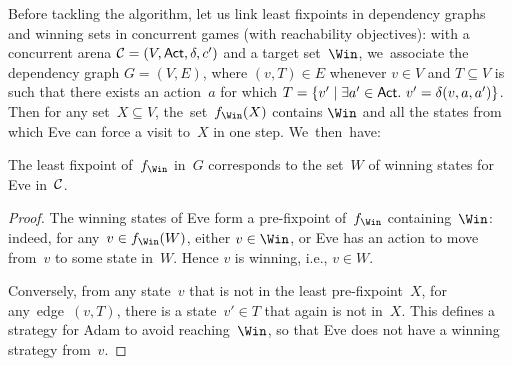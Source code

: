 Before tackling the algorithm, let us link least fixpoints in
dependency graphs and winning sets in concurrent games (with
reachability objectives): with a concurrent arena
$\mathcal{C}=(V,\textsf{Act},\delta,c')$ and a target set~$\Win$, we~associate
the dependency graph $G=(V,E)$, where $(v,T)\in E$ whenever $v\in V$
and $T\subseteq V$ is such that there exists an action~$a$ for which
$T=\{v' \mid \exists a'\in\Act.\ v'=\delta(v,a,a')\}$.  Then for any
set~$X\subseteq V$, the~set~$f_{\Win}(X)$ contains $\Win$ and all the
states from which Eve can force a visit to~$X$ in one step.
We~then~have:
\begin{proposition}\label{9-prop:fixp-game}
The least fixpoint of~$f_{\Win}$ in~$G$ corresponds to the set~$W$ of
winning states for Eve in~$\mathcal{C}$.
\end{proposition}

\begin{proof}
  The winning states of Eve form a pre-fixpoint of~$f_{\Win}$
  containing~$\Win$: indeed, for any~$v\in f_{\Win}(W)$, either $v\in
  \Win$, or Eve has an action to move from~$v$ to some state
  in~$W$. Hence $v$ is winning, i.e., $v\in W$.
  

  Conversely, from any state~$v$ that is not in the least
  pre-fixpoint~$X$, for any~edge~$(v,T)$, there is a state~$v'\in T$
  that again is not in~$X$. This defines a strategy for Adam to avoid
  reaching~$\Win$, so that Eve does not have a winning strategy from~$v$.
\end{proof}




